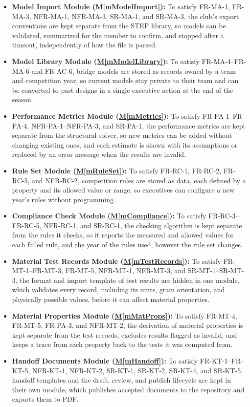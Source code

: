 \documentclass[12pt, titlepage]{article}
\newcommand{\mref}[1]{\hyperref[#1:dec]{M\ref*{#1}}}
\begin{document}
\begin{itemize}
\item \textbf{Model Import Module (\mref{mModelImport}):} To satisfy FR-MA-1, FR-MA-3, NFR-MA-1, NFR-MA-3, SR-MA-1, and SR-MA-3, the club's export conventions are kept separate from the STEP library, so models can be validated, summarized for the member to confirm, and stopped after a timeout, independently of how the file is parsed.
\item \textbf{Model Library Module (\mref{mModelLibrary}):} To satisfy FR-MA-4--FR-MA-6 and FR-AC-6, bridge models are stored as records owned by a team and competition year, so current models stay private to their team and can be converted to past designs in a single executive action at the end of the season.
\item \textbf{Performance Metrics Module (\mref{mMetrics}):} To satisfy FR-PA-1--FR-PA-4, NFR-PA-1--NFR-PA-3, and SR-PA-1, the performance metrics are kept separate from the structural solver, so new metrics can be added without changing existing ones, and each estimate is shown with its assumptions or replaced by an error message when the results are invalid.
\item \textbf{Rule Set Module (\mref{mRuleSet}):} To satisfy FR-RC-1, FR-RC-2, FR-RC-5, and NFR-RC-2, competition rules are stored as data, each defined by a property and its allowed value or range, so executives can configure a new year's rules without programming.
\item \textbf{Compliance Check Module (\mref{mCompliance}):} To satisfy FR-RC-3--FR-RC-5, NFR-RC-1, and SR-RC-1, the checking algorithm is kept separate from the rules it checks, so it reports the measured and allowed values for each failed rule, and the year of the rules used, however the rule set changes.
\item \textbf{Material Test Records Module (\mref{mTestRecords}):} To satisfy FR-MT-1--FR-MT-3, FR-MT-5, NFR-MT-1, NFR-MT-3, and SR-MT-1--SR-MT-3, the format and import template of test results are hidden in one module, which validates every record, including its units, grain orientation, and physically possible values, before it can affect material properties.
\item \textbf{Material Properties Module (\mref{mMatProps}):} To satisfy FR-MT-4, FR-MT-5, FR-PA-3, and NFR-MT-2, the derivation of material properties is kept separate from the test records, excludes results flagged as invalid, and keeps a trace from each property back to the tests it was computed from.
\item \textbf{Handoff Documents Module (\mref{mHandoff}):} To satisfy FR-KT-1--FR-KT-5, NFR-KT-1, NFR-KT-2, SR-KT-1, SR-KT-2, SR-KT-4, and SR-KT-5, handoff templates and the draft, review, and publish lifecycle are kept in their own module, which publishes accepted documents to the repository and exports them to PDF.

\end{itemize}
\end{document}
